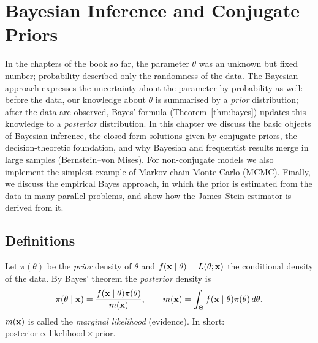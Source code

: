 \documentclass[main.tex]{subfiles}
\begin{document}
\chapter{Bayesian Inference and Conjugate Priors}\label{ch:bayes}

In the chapters of the book so far, the parameter $\theta$ was an unknown but fixed number; probability described only the randomness of the data. The Bayesian approach expresses the uncertainty about the parameter by probability as well: before the data, our knowledge about $\theta$ is summarised by a \emph{prior} distribution; after the data are observed, Bayes' formula (Theorem~\ref{thm:bayes}) updates this knowledge to a \emph{posterior} distribution. In this chapter we discuss the basic objects of Bayesian inference, the closed-form solutions given by conjugate priors, the decision-theoretic foundation, and why Bayesian and frequentist results merge in large samples (Bernstein--von Mises). For non-conjugate models we also implement the simplest example of Markov chain Monte Carlo (MCMC). Finally, we discuss the empirical Bayes approach, in which the prior is estimated from the data in many parallel problems, and show how the James--Stein estimator is derived from it.

\section{Definitions}

\begin{definition}
Let $\pi(\theta)$ be the \emph{prior} density of $\theta$ and $f(\mathbf{x}\mid\theta)=L(\theta;\mathbf{x})$ the conditional density of the data. By Bayes' theorem the \emph{posterior} density is
\[
\pi(\theta\mid\mathbf{x})=\frac{f(\mathbf{x}\mid\theta)\pi(\theta)}{m(\mathbf{x})},\qquad m(\mathbf{x})=\int_\Theta f(\mathbf{x}\mid\theta)\pi(\theta)\,d\theta .
\]
$m(\mathbf{x})$ is called the \emph{marginal likelihood} (evidence). In short: $\text{posterior}\propto\text{likelihood}\times\text{prior}$.
\end{definition}
\end{document}
